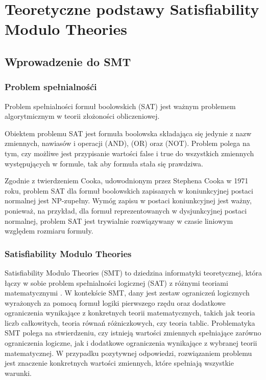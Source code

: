\chapter{Teoretyczne podstawy Satisfiability Modulo Theories}

\section{Wprowadzenie do SMT}

\subsection{Problem spełnialnośći}
Problem spełnialności formuł boolowskich (SAT) jest ważnym problemem algorytmicznym w teorii złożoności obliczeniowej.

Obiektem problemu SAT jest formuła boolowska składająca się jedynie z nazw zmiennych, nawiasów i operacji 
{\wedge} (AND), {\vee} (OR) oraz {\neg} (NOT). Problem polega na tym, czy możliwe jest przypisanie wartości false i true do wszystkich zmiennych występujących w formule, tak aby formuła stała się prawdziwa.

Zgodnie z twierdzeniem Cooka, udowodnionym przez Stephena Cooka w 1971 roku, problem SAT dla formuł boolowskich zapisanych w koniunkcyjnej postaci normalnej jest NP-zupełny. Wymóg zapisu w postaci koniunkcyjnej jest ważny, ponieważ, na przykład, dla formuł reprezentowanych w dysjunkcyjnej postaci normalnej, problem SAT jest trywialnie rozwiązywany w czasie liniowym względem rozmiaru formuły.

\subsection{Satisfiability Modulo Theories}
Satisfiability Modulo Theories (SMT) to dziedzina informatyki teoretycznej, która łączy w sobie problem spełnialności logicznej (SAT) z różnymi teoriami matematycznymi \cite{MouraB11}. 
W kontekście SMT, dany jest zestaw ograniczeń logicznych wyrażonych za pomocą formuł logiki pierwszego rzędu oraz dodatkowe ograniczenia wynikające z konkretnych teorii matematycznych, takich jak teoria liczb całkowitych, teoria równań różniczkowych, czy teoria tablic.
Problematyka SMT polega na stwierdzeniu, czy istnieją wartości zmiennych spełniające zarówno ograniczenia logiczne, jak i dodatkowe ograniczenia wynikające z wybranej teorii matematycznej. W przypadku pozytywnej odpowiedzi, rozwiązaniem problemu jest znaczenie konkretnych wartości zmiennych, które spełniają wszystkie warunki.
	
